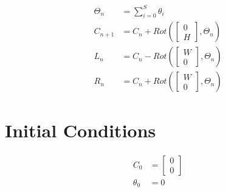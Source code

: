 \documentclass{article}
\begin{document}
\begin{align}
    \Theta_n &= \sum_{i=0}^S \theta_i \\
    C_{n+1} &= C_n + Rot(\begin{bmatrix} 0 \\ H \end{bmatrix}, \Theta_n) \\
    L_{n} &= C_n - Rot(\begin{bmatrix} W \\ 0 \end{bmatrix}, \Theta_n) \\
    R_{n} &= C_n + Rot(\begin{bmatrix} W \\ 0 \end{bmatrix}, \Theta_n)
\end{align}

\section{Initial Conditions}

\begin{align}
    C_0 &= \begin{bmatrix} 0 \\ 0 \end{bmatrix} \\
    \theta_0 &= 0
\end{align}
\end{document}
